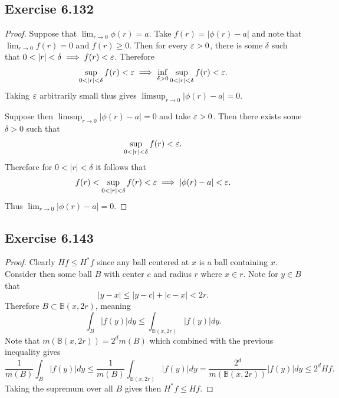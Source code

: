 \documentclass[hw_all.tex]{subfiles}
\begin{document}
\subsection{Exercise 6.132}
\begin{proof}
    Suppose that $\lim_{r \to 0} \phi(r) = a$. Take $f(r) = |\phi(r) - a|$ and note that $\lim_{r \to 0} f(r) = 0$ and $f(r) \geq 0$. Then for every $\varepsilon > 0$, there is some $\delta$ such that $0 < |r| < \delta \implies f(r) < \varepsilon$. Therefore
    \[
        \sup_{0 < |r| < \delta} f(r) < \varepsilon \implies \inf_{\delta > 0} \sup_{0 < |r| < \delta} f(r) < \varepsilon
    .\]
    Taking $\varepsilon$ arbitrarily small thus gives $\limsup_{r \to 0} |\phi(r) - a| = 0$.

    Suppose then $\limsup_{r \to 0} |\phi(r) - a| = 0$ and take $\varepsilon > 0$. Then there exists some $\delta > 0$ such that
    \[
        \sup_{0 < |r| < \delta} f(r) < \varepsilon
    .\]
    Therefore for $0 < |r| < \delta$ it follows that
    \[
        f(r) < \sup_{0 < |r| < \delta} f(r) < \varepsilon \implies |\phi(r) - a| < \varepsilon
    .\]
    Thus $\lim_{r \to 0} |\phi(r) - a| = 0$.
\end{proof}

\subsection{Exercise 6.143}
\begin{proof}
    Clearly $Hf \leq H^* f$ since any ball centered at $x$ is a ball containing $x$. Consider then some ball $B$ with center $c$ and radius $r$ where $x \in r$. Note for $y \in B$ that
    \[
        |y - x| \leq |y - c| + |c - x| < 2r
    .\]
    Therefore $B \subset \mathbb{B}(x,2r)$, meaning
    \[
        \int_{B} |f(y)| dy \leq \int_{\mathbb{B}(x,2r)} |f(y)| dy
    .\]
    Note that $m(\mathbb{B}(x,2r)) = 2^d m(B)$ which combined with the previous inequality gives
    \[
        \frac{1}{m(B)} \int_B |f(y)| dy \leq \frac{1}{m(B)} \int_{\mathbb{B}(x,2r)} |f(y)| dy = \frac{2^d}{m(\mathbb{B}(x,2r))} |f(y)| dy \leq 2^d H f
    .\]
    Taking the supremum over all $B$ gives then $H^* f \leq Hf$.
\end{proof}
\end{document}
